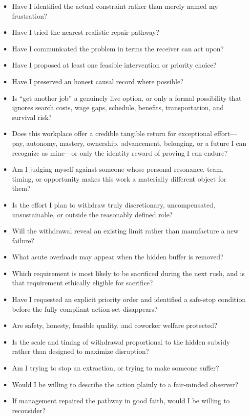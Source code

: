 \documentclass[11pt,oneside]{article}
\providecommand{\tightlist}{%
  \setlength{\itemsep}{0.22em}\setlength{\parskip}{0pt}}
\begin{document}
\begin{itemize}
\tightlist
\item
  Have I identified the actual constraint rather than merely named my
  frustration?
\item
  Have I tried the nearest realistic repair pathway?
\item
  Have I communicated the problem in terms the receiver can act upon?
\item
  Have I proposed at least one feasible intervention or priority choice?
\item
  Have I preserved an honest causal record where possible?
\item
  Is ``get another job'' a genuinely live option, or only a formal
  possibility that ignores search costs, wage gaps, schedule, benefits,
  transportation, and survival risk?
\item
  Does this workplace offer a credible tangible return for exceptional
  effort---pay, autonomy, mastery, ownership, advancement, belonging, or
  a future I can recognize as mine---or only the identity reward of
  proving I can endure?
\item
  Am I judging myself against someone whose personal resonance, team,
  timing, or opportunity makes this work a materially different object
  for them?
\item
  Is the effort I plan to withdraw truly discretionary, uncompensated,
  unsustainable, or outside the reasonably defined role?
\item
  Will the withdrawal reveal an existing limit rather than manufacture a
  new failure?
\item
  What acute overloads may appear when the hidden buffer is removed?
\item
  Which requirement is most likely to be sacrificed during the next
  rush, and is that requirement ethically eligible for sacrifice?
\item
  Have I requested an explicit priority order and identified a safe-stop
  condition before the fully compliant action-set disappears?
\item
  Are safety, honesty, feasible quality, and coworker welfare protected?
\item
  Is the scale and timing of withdrawal proportional to the hidden
  subsidy rather than designed to maximize disruption?
\item
  Am I trying to stop an extraction, or trying to make someone suffer?
\item
  Would I be willing to describe the action plainly to a fair-minded
  observer?
\item
  If management repaired the pathway in good faith, would I be willing
  to reconsider?
\end{itemize}
\end{document}
